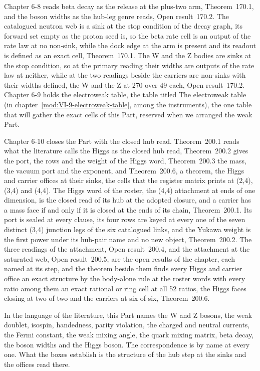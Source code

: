 Chapter 6-8 reads beta decay as the release at the plus-two arm, Theorem~170.1, and the boson widths as the hub-leg genre reads, Open result~170.2. The catalogued neutron web is a sink at the stop condition of the decay graph, its forward set empty as the proton seed is, so the beta rate cell is an output of the rate law at no non-sink, while the dock edge at the arm is present and its readout is defined as an exact cell, Theorem~170.1. The W and the Z bodies are sinks at the stop condition, so at the primary reading their widths are outputs of the rate law at neither, while at the two readings beside the carriers are non-sinks with their widths defined, the W and the Z at 270 over 49 each, Open result~170.2. Chapter 6-9 holds the electroweak table, the table titled The electroweak table (in chapter~\ref{mod:VI-9-electroweak-table}, among the instruments), the one table that will gather the exact cells of this Part, reserved when we arranged the weak Part.

Chapter 6-10 closes the Part with the closed hub read. Theorem~200.1 reads what the literature calls the Higgs as the closed hub read, Theorem~200.2 gives the port, the rows and the weight of the Higgs word, Theorem~200.3 the mass, the vacuum port and the exponent, and Theorem~200.6, a theorem, the Higgs and carrier offices at their sinks, the cells that the register matrix prints at (2,4), (3,4) and (4,4). The Higgs word of the roster, the (4,4) attachment at ends of one dimension, is the closed read of its hub at the adopted closure, and a carrier has a mass face if and only if it is closed at the ends of its chain, Theorem~200.1. Its port is sealed at every clause, its four rows are keyed at every one of the seven distinct (3,4) junction legs of the six catalogued links, and the Yukawa weight is the first power under its hub-pair name and no new object, Theorem~200.2. The three readings of the attachment, Open result~200.4, and the attachment at the saturated web, Open result~200.5, are the open results of the chapter, each named at its step, and the theorem beside them finds every Higgs and carrier office an exact structure by the body-alone rule at the roster words with every ratio among them an exact rational or ring cell at all 52 ratios, the Higgs faces closing at two of two and the carriers at six of six, Theorem~200.6.

In the language of the literature, this Part names the W and Z bosons, the weak doublet, isospin, handedness, parity violation, the charged and neutral currents, the Fermi constant, the weak mixing angle, the quark mixing matrix, beta decay, the boson widths and the Higgs boson. The correspondence is by name at every one. What the boxes establish is the structure of the hub step at the sinks and the offices read there.

